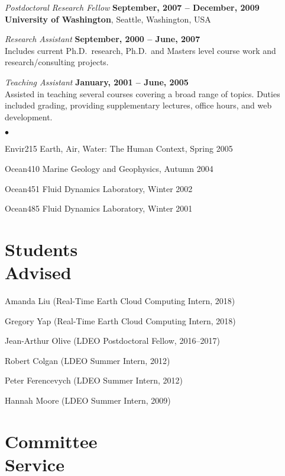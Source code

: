 \documentclass[11pt]{res}
\newenvironment{list2}{
  \begin{list}{$\bullet$}{%
      \setlength{\itemsep}{0in}
      \setlength{\parsep}{0in} \setlength{\parskip}{0in}
      \setlength{\topsep}{0in} \setlength{\partopsep}{0in} 
      \setlength{\leftmargin}{0.2in}}}{\end{list}}
\begin{document}
\begin{resume}
\vspace{-.3cm}
{\em Postdoctoral Research Fellow} \hfill {\bf September, 2007 -- December, 2009}\\

{\bf University of Washington}, Seattle, Washington, USA

{\em Research Assistant} \hfill {\bf September, 2000 -- June, 2007}\\
Includes current Ph.D.~research, Ph.D.~and Masters level course work and
research/consulting projects.

{\em Teaching Assistant} \hfill {\bf January, 2001 -- June, 2005}\\
Assisted in teaching several courses covering a broad range of topics. Duties included
grading, providing supplementary lectures, office hours, and web development.
\vspace*{0.05in}
\begin{list2}
\item Envir215 Earth, Air, Water: The Human Context, Spring 2005
\item Ocean410 Marine Geology and Geophysics, Autumn 2004
\item Ocean451 Fluid Dynamics Laboratory, Winter 2002
\item Ocean485 Fluid Dynamics Laboratory, Winter 2001
\end{list2}

\section{\sc Students\\Advised}

Amanda Liu (Real-Time Earth Cloud Computing Intern, 2018)

Gregory Yap (Real-Time Earth Cloud Computing Intern, 2018)

Jean-Arthur Olive (LDEO Postdoctoral Fellow, 2016--2017)

Robert Colgan (LDEO Summer Intern, 2012)

Peter Ferencevych (LDEO Summer Intern, 2012)

Hannah Moore (LDEO Summer Intern, 2009)
\vspace{0.2in}

\section{\sc Committee\\Service}


\end{resume}
\end{document}
